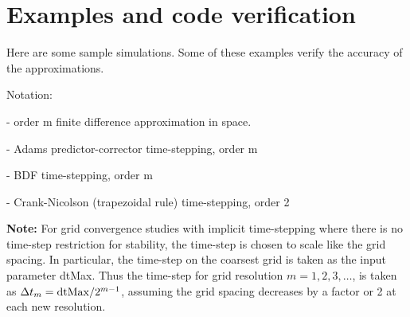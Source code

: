 \section{Examples and code verification} \label{sec:examples}

Here are some sample simulations. Some of these examples verify the
accuracy of the approximations.

\bni
Notation:
\begin{description}[noitemsep]
   \item[\qquad FDm] - order m finite difference approximation in space.
   \item[\qquad PCm] - Adams predictor-corrector time-stepping, order m
   \item[\qquad BDFm] - BDF time-stepping, order m
   \item[\qquad CN] - Crank-Nicolson (trapezoidal rule) time-stepping, order 2
\end{description}

\mni\textbf{Note:} 
For grid convergence studies with implicit time-stepping where there is no time-step
restriction for stability, the time-step is chosen to scale
like the grid spacing. In particular, the time-step on the coarsest grid is taken as the input
parameter {\rm dtMax}. Thus the time-step for grid resolution $m=1,2,3,\ldots$, 
is taken as ${\Delta t}_m = {\rm dtMax}/2^{m-1}$, assuming 
the grid spacing
decreases by a factor or 2 at each new resolution.

\clearpage


\clearpage


\clearpage





